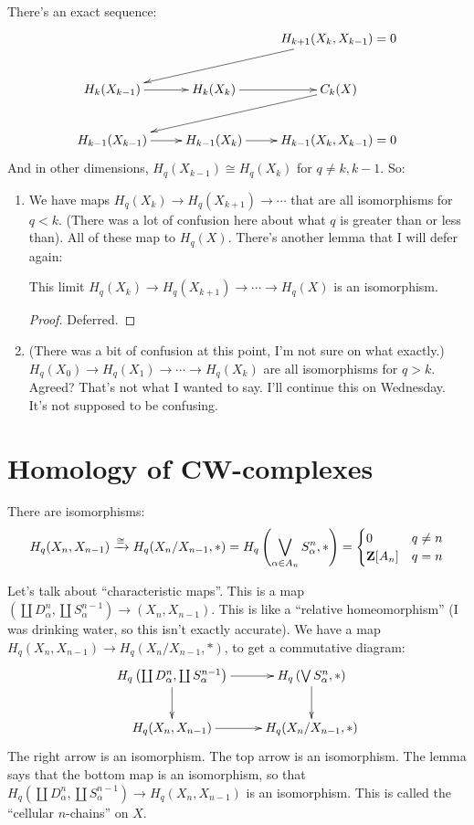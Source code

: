 \begin{corollary}
There's an exact sequence:
\begin{equation*}
\xymatrix{ & & H_{k+1}(X_k,X_{k-1})=0\ar[dll]\\
 H_k(X_{k-1})\ar[r] & H_k(X_k)\ar[r] & C_k(X)\ar[dll]\\
 H_{k-1}(X_{k-1})\ar[r] & H_{k-1}(X_k)\ar[r] & H_{k-1}(X_k,X_{k-1})=0}
\end{equation*}
And in other dimensions, $ H_q(X_{k-1})\cong H_q(X_k)$ for $q\neq k,k-1$. So:
\begin{enumerate}
\item We have maps $ H_q(X_k)\to H_q(X_{k+1})\to\cdots$ that are all isomorphisms for $q<k$. (There was a lot of confusion here about what $q$ is greater than or less than). All of these map to $ H_q(X)$. There's another lemma that I will defer again:
	\begin{lemma}
	This limit $ H_q(X_k)\to H_q(X_{k+1})\to\cdots\to H_q(X)$ is an isomorphism.
	\end{lemma}
	\begin{proof}
	Deferred.
	\end{proof}
\item (There was a bit of confusion at this point, I'm not sure on what exactly.) $ H_q(X_0)\to H_q(X_1)\to\cdots\to H_q(X_k)$ are all isomorphisms for $q>k$. Agreed? That's not what I wanted to say. I'll continue this on Wednesday. It's not supposed to be confusing.
\end{enumerate}
\end{corollary}
\section{Homology of CW-complexes}
\begin{lemma}
There are isomorphisms:
\begin{equation*}
 H_q(X_n,X_{n-1})\xrightarrow{\cong} H_q(X_n/X_{n-1},\ast)= H_q\left(\bigvee_{\alpha\in A_n}S^n_\alpha,\ast\right)=\begin{cases}0 & q\neq n \\ \mathbf Z[A_n] & q=n\end{cases}
\end{equation*}
\end{lemma}
Let's talk about ``characteristic maps''. This is a map $\left(\coprod D^n_\alpha,\coprod S^{n-1}_\alpha\right)\to (X_n,X_{n-1})$. This is like a ``relative homeomorphism'' (I was drinking water, so this isn't exactly accurate). We have a map $ H_q(X_n,X_{n-1})\to H_q(X_n/X_{n-1},\ast)$, to get a commutative diagram:
\begin{equation*}
\xymatrix{ H_q\left(\coprod D^n_\alpha,\coprod S^{n-1}_\alpha\right)\ar[r]\ar[d] & H_q\left(\bigvee S^n_\alpha,\ast\right)\ar[d]\\
 H_q(X_n,X_{n-1})\ar[r] & H_q(X_n/X_{n-1},\ast)}
\end{equation*}
The right arrow is an isomorphism. The top arrow is an isomorphism. The lemma says that the bottom map is an isomorphism, so that $ H_q\left(\coprod D^n_\alpha,\coprod S^{n-1}_\alpha\right)\to H_q(X_n,X_{n-1})$ is an isomorphism. This is called the ``cellular $n$-chains'' on $X$.

